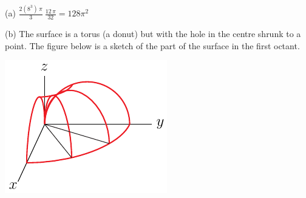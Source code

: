 \begin{answer}
(a) $\frac{2(8^3)\,\pi}{3}\ \frac{12\,\pi}{32}=128\pi^2$

(b) The surface is a torus (a donut) but with the hole in the centre 
shrunk to a point.
The figure below is a sketch of the part of the surface in the
first octant.

\begin{center}
     \includegraphics{fig/torusB.pdf}
\end{center}
\end{answer}

